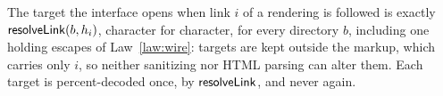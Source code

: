 \begin{law}
\label{law:link-exact}
The target the interface opens when link $i$ of a rendering is followed is
exactly $\mathsf{resolveLink}(b,h_i)$, character for character, for every directory $b$,
including one holding escapes of Law~\ref{law:wire}: targets are kept outside
the markup, which carries only $i$, so neither sanitizing nor HTML parsing can
alter them.  Each target is percent-decoded once, by $\mathsf{resolveLink}$, and never again.
\end{law}
